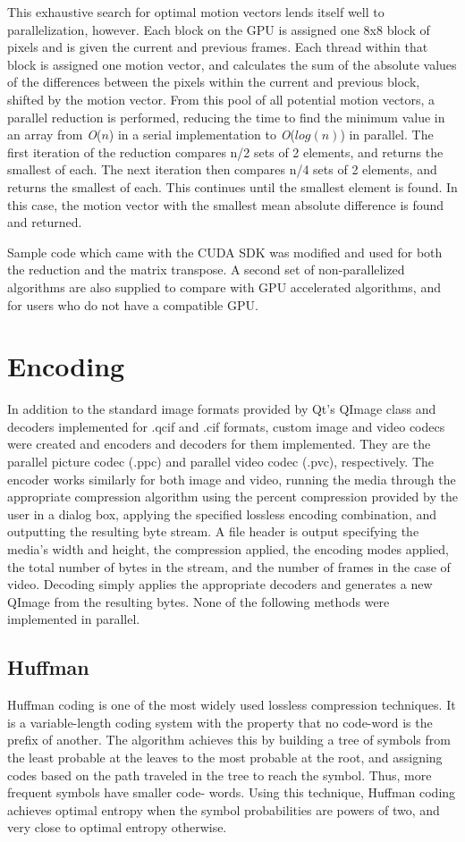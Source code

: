 \documentclass[10pt,twocolumn,twoside]{IEEEtran}
\renewcommand{\O}[1]{\textit{O}(\ensuremath{#1})}
\begin{document}
This exhaustive search for optimal motion vectors lends itself well to parallelization, however. Each block on 
the GPU is assigned one 8x8 block of pixels and is given the current and previous frames. Each thread within 
that block is assigned one motion vector, and calculates the sum of the absolute values of the differences 
between the pixels within the current and previous block, shifted by the motion vector. From this pool of all 
potential motion vectors, a parallel reduction is performed, reducing the time to find the minimum value in an 
array from \O{n} in a serial implementation to \O{log(n)} in parallel. The first iteration of the reduction 
compares n/2 sets of 2 elements, and returns the smallest of each. The next iteration then compares n/4 sets 
of 2 elements, and returns the smallest of each. This continues until the smallest element is found. In this 
case, the motion vector with the smallest mean absolute difference is found and returned. 

Sample code which came with the CUDA SDK was modified and used for both the reduction and the matrix 
transpose. A second set of non-parallelized algorithms are also supplied to compare with GPU accelerated 
algorithms, and for users who do not have a compatible GPU.

\section{Encoding}
In addition to the standard image formats provided by Qt's QImage class and decoders implemented for .qcif 
and .cif formats, custom image and video codecs were created and encoders and decoders for them implemented. 
They are the parallel picture codec (.ppc) and parallel video codec (.pvc), respectively. The encoder works 
similarly for both image and video, running the media through the appropriate compression algorithm using the 
percent compression provided by the user in a dialog box, applying the specified lossless encoding 
combination, and outputting the resulting byte stream. A file header is output specifying the media's width 
and height, the compression applied, the encoding modes applied, the total number of bytes in the stream, and 
the number of frames in the case of video. Decoding simply applies the appropriate decoders and generates a 
new QImage from the resulting bytes. None of the following methods were implemented in parallel.

\subsection{Huffman}
Huffman coding is one of the most widely used lossless compression techniques. It is a variable-length coding 
system with the property that no code-word is the prefix of another. The algorithm achieves this by building a 
tree of symbols from the least probable at the leaves to the most probable at the root, and assigning codes 
based on the path traveled in the tree to reach the symbol. Thus, more frequent symbols have smaller code-
words. Using this technique, Huffman coding achieves optimal entropy when the symbol probabilities are powers 
of two, and very close to optimal entropy otherwise.
\end{document}
